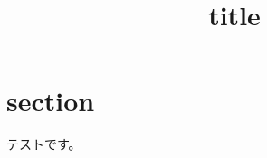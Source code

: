 \documentclass[twocolumn,a4paper,dvipdfmx]{jsarticle}
\title{title}
\author{}
\begin{document}
\maketitle
\section{section}

テストです。
\cite{test}



\end{document}
